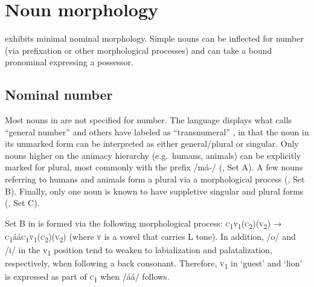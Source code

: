 \documentclass[output=paper]{langsci/langscibook}
\begin{document}
\section{Noun morphology}\label{sec:ahlandc:7}


 exhibits minimal nominal morphology. Simple nouns can be inflected for number (via prefixation or other morphological processes) and can take a bound  pronominal expressing a possessor.  

\subsection{Nominal number}\label{sec:ahlandc:7.1}


Most nouns in  are not specified for number. The language displays what \citet{Corbett2000} calls “general number” and others have labeled as “transnumeral” \citep{Biermann1982,StorchDimmendaal2014}, in that the noun in its unmarked form can be interpreted as either general/plural or singular. Only nouns higher on the animacy hierarchy (e.g.\ humans, animals) can be explicitly marked for plural, most commonly with the prefix /má-/ (, Set A). A few nouns referring to humans and animals form a plural via a morphological process (, Set B). Finally, only one noun is known to have suppletive singular and plural forms (, Set C).

Set B in  is formed via the following morphological process: \textsc{c}\textsubscript{1}v\textsubscript{1}(\textsc{c}\textsubscript{2})(\textsc{v}\textsubscript{2}) → \textsc{c}\textsubscript{1}áá\textsc{c}\textsubscript{1}\textsc{\`{v}}\textsubscript{1}(\textsc{c}\textsubscript{2})(\textsc{v}\textsubscript{2}) (where \textsc{\`{v}} is a vowel that carries L tone). In addition, /o/ and /i/ in the v\textsubscript{1} position tend to weaken to labialization and palatalization, respectively, when following a back consonant. Therefore, \textsc{v}\textsubscript{1} in ‘guest’ and ‘lion’ is expressed as part of \textsc{c}\textsubscript{1} when /áá/ follows.
\end{document}
